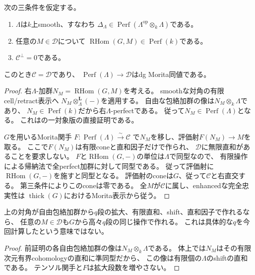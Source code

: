 \begin{theorem}[有限性とsmoothnessによる全体への飽和]
\label{crs:thm:abstract}
次の三条件を仮定する。
\begin{enumerate}
\item $\Lambda$は$k$上smooth、すなわち
$\Delta_\Lambda\in\operatorname{Perf}(\Lambda^{\mathrm{op}}\otimes_k\Lambda)$である。
\item 任意の$M\in\mathcal D$について
$\operatorname{RHom}(G,M)\in\operatorname{Perf}(k)$である。
\item $\mathcal C^\perp=0$である。
\end{enumerate}
このとき$\mathcal C=\mathcal D$であり、
$\operatorname{Perf}(\Lambda)\to\mathcal D$はdg Morita同値である。
\end{theorem}
\begin{proof}
右$\Lambda$-加群$N_M=\operatorname{RHom}(G,M)$を考える。
smoothな対角の有限cell/retract表示へ
$N_M\otimes_\Lambda^{\mathbf L}(-)$を適用する。
自由な包絡加群の像は$N_M\otimes_k\Lambda$であり、
$N_M\in\operatorname{Perf}(k)$だから右$\Lambda$-perfectである。
従って$N_M\in\operatorname{Perf}(\Lambda)$となる。
これは\cite[Lemma~2.8(2)]{CRSTV}の一対象版の直接証明である。

$G$を用いるMorita関手
$F:\operatorname{Perf}(\Lambda)\xrightarrow{\sim}\mathcal C$
で$N_M$を移し、評価射$F(N_M)\to M$を取る。
ここで$F(N_M)$は有限coneと直和因子だけで作られ、
$\mathcal D$に無限直和があることを要求しない。
$F$と$\operatorname{RHom}(G,-)$の単位は$\Lambda$で同型なので、
有限操作による帰納法で全perfect加群に対して同型である。
従って評価射に$\operatorname{RHom}(G,-)$を施すと同型となる。
評価射のconeは$G$、従って$\mathcal C$と右直交する。
第三条件によりこのconeは零である。
全$M$が$\mathcal C$に属し、enhancedな完全忠実性は
$\operatorname{thick}(G)$におけるMorita表示から従う。
\end{proof}

\begin{corollary}[対角の有限表示からの一様な生成長]
\label{crs:cor:level}
上の対角が自由包絡加群から$q$段の拡大、有限直和、shift、直和因子で作れるなら、
任意の$M\in\mathcal D$も$G$から高々$q$段の同じ操作で作れる。
これは具体的な$q$を今回計算したという意味ではない。
\end{corollary}
\begin{proof}
前証明の各自由包絡加群の像は$N_M\otimes_k\Lambda$である。
体上では$N_M$はその有限次元有界cohomologyの直和に準同型だから、
この像は有限個の$\Lambda$のshiftの直和である。
テンソル関手と$F$は拡大段数を増やさない。
\end{proof}

